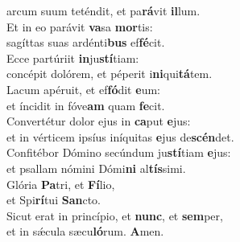 \oddverse arcum suum teténdit, et pa\textbf{rá}vit \textbf{il}lum.\\
\evenverse Et in eo parávit \textbf{va}sa \textbf{mor}tis:~\*\\
\evenverse sagíttas suas ardénti\textbf{bus} ef\textbf{fé}cit.\\
\oddverse Ecce partúriit \textbf{in}ju\textbf{stí}tiam:~\*\\
\oddverse concépit dolórem, et péperit i\textbf{ni}qui\textbf{tá}tem.\\
\evenverse Lacum apéruit, et ef\textbf{fó}dit \textbf{e}um:~\*\\
\evenverse et íncidit in fóve\textbf{am} quam \textbf{fe}cit.\\
\oddverse Convertétur dolor ejus in \textbf{ca}put \textbf{e}jus:~\*\\
\oddverse et in vérticem ipsíus iníquitas \textbf{e}jus de\textbf{scén}det.\\
\evenverse Confitébor Dómino secúndum ju\textbf{stí}tiam \textbf{e}jus:~\*\\
\evenverse et psallam nómini Dómi\textbf{ni} al\textbf{tís}simi.\\
\oddverse Glória \textbf{Pa}tri, et \textbf{Fí}lio,~\*\\
\oddverse et Spi\textbf{rí}tui \textbf{San}cto.\\
\evenverse Sicut erat in princípio, et \textbf{nunc}, et \textbf{sem}per,~\*\\
\evenverse et in sǽcula sæcu\textbf{ló}rum. \textbf{A}men.\\
